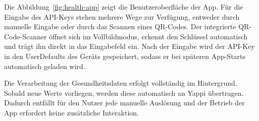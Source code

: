 \documentclass[12pt,a4paper]{report}
\begin{document}
Die Abbildung~\ref{fig:health-app} zeigt die Benutzeroberfläche der App. Für die Eingabe des API-Keys stehen mehrere Wege zur
Verfügung, entweder durch manuelle Eingabe oder durch das Scannen eines QR-Codes. Der integrierte QR-Code-Scanner öffnet sich im
Vollbildmodus, erkennt den Schlüssel automatisch und trägt ihn direkt in das Eingabefeld ein. Nach der Eingabe wird der API-Key
in den UserDefaults des Geräts gespeichert, sodass er bei späteren App-Starts automatisch geladen wird.

Die Verarbeitung der Gesundheitsdaten erfolgt vollständig im Hintergrund. Sobald neue Werte vorliegen, werden diese automatisch an
Yappi übertragen. Dadurch entfällt für den Nutzer jede manuelle Auslösung und der Betrieb der App erfordert keine zusätzliche
Interaktion.

\printbibliography
\end{document}
